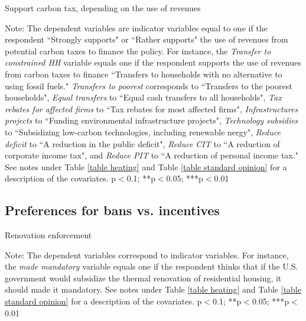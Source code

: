 \documentclass{article}
\begin{document}
\begin{landscape}
	\begin{table}[h!]
	\caption{Support carbon tax, depending on the use of revenues}
	\begin{center}
		\scalebox{0.55}{}
	\end{center}
	{\footnotesize Note: The dependent variables are indicator variables equal to one if the respondent ``Strongly supports" or ``Rather supports" the use of revenues from potential carbon taxes to finance the policy. For instance, the \textit{Transfer to constrained HH} variable equals one if the respondent supports the use of revenues from carbon taxes to finance ``Transfers to households with no alternative to using fossil fuels." \textit{Transfers to poorest} corresponds to ``Transfers to the poorest households", \textit{Equal transfers} to ``Equal cash transfers to all households", \textit{Tax rebates for affected firms} to ``Tax rebates for most affected firms", \textit{Infrastructures projects} to ``Funding environmental infrastructure projects", \textit{Technology subsidies} to ``Subsidizing low-carbon technologies, including renewable nergy", \textit{Reduce deficit} to ``A reduction in the public deficit", \textit{Reduce CIT} to ``A reduction of corporate income tax", and \textit{Reduce PIT} to ``A reduction of personal income tax." See notes under Table \ref{table heating} and Table \ref{table standard opinion} for a description of the covariates.
	\newline *p$<$0.1; **p$<$0.05; ***p$<$0.01}
\end{table}	
\end{landscape}

\clearpage
\subsection{Preferences for bans vs. incentives}

\begin{table}[h!]
	\caption{Renovation enforcement}
	\begin{center}
		\scalebox{0.7}{}
	\end{center}
	{\footnotesize Note: The dependent variables correspond to indicator variables. For instance, the \textit{made mandatory} variable equals one if the respondent thinks that if the U.S. government would subsidize the thermal renovation of residential housing, it should made it mandatory. See notes under Table \ref{table heating} and Table \ref{table standard opinion} for a description of the covariates.
	\newline *p$<$0.1; **p$<$0.05; ***p$<$0.01}
\end{table}	
\end{document}

